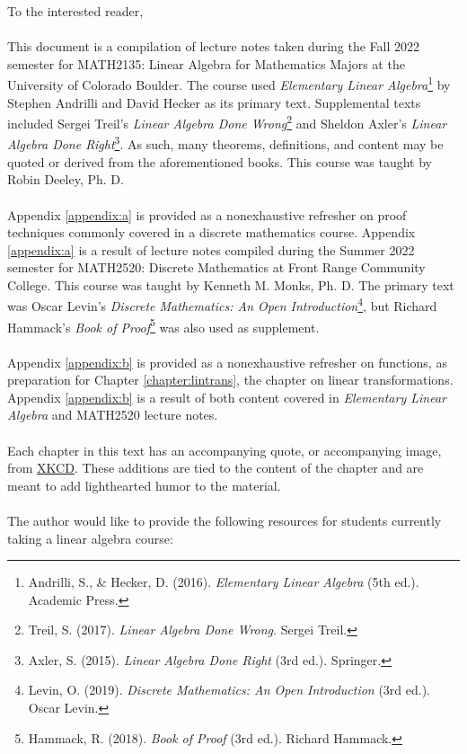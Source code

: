 To the interested reader,
\\
\\
This document is a compilation of lecture notes taken during the Fall 2022 semester for MATH2135: Linear Algebra for Mathematics Majors at the University of Colorado Boulder. The course used \textit{Elementary Linear Algebra}\footnote{Andrilli, S., \& Hecker, D. (2016). \textit{Elementary Linear Algebra} (5th ed.). Academic Press.} by Stephen Andrilli and David Hecker as its primary text. Supplemental texts included Sergei Treil's \textit{Linear Algebra Done Wrong}\footnote{Treil, S. (2017). \textit{Linear Algebra Done Wrong}. Sergei Treil.} and Sheldon Axler's \textit{Linear Algebra Done Right}\footnote{Axler, S. (2015). \textit{Linear Algebra Done Right} (3rd ed.). Springer. }. As such, many theorems, definitions, and content may be quoted or derived from the aforementioned books. This course was taught by Robin Deeley, Ph. D.
\\
\\
Appendix \ref{appendix:a} is provided as a nonexhaustive refresher on proof techniques commonly covered in a discrete mathematics course. Appendix \ref{appendix:a} is a result of lecture notes compiled during the Summer 2022 semester for MATH2520: Discrete Mathematics at Front Range Community College. This course was taught by Kenneth M. Monks, Ph. D. The primary text was Oscar Levin's \textit{Discrete Mathematics: An Open Introduction}\footnote{Levin, O. (2019). \textit{Discrete Mathematics: An Open Introduction} (3rd ed.). Oscar Levin.}, but Richard Hammack's \textit{Book of Proof}\footnote{Hammack, R. (2018). \textit{Book of Proof} (3rd ed.). Richard Hammack.} was also used as supplement.
\\
\\
Appendix \ref{appendix:b} is provided as a nonexhaustive refresher on functions, as preparation for Chapter \ref{chapter:lintrans}, the chapter on linear transformations. Appendix \ref{appendix:b} is a result of both content covered in \textit{Elementary Linear Algebra} and MATH2520 lecture notes.
\\
\\
Each chapter in this text has an accompanying quote, or accompanying image, from \href{https://xkcd.com/license.html}{XKCD}. These additions are tied to the content of the chapter and are meant to add lighthearted humor to the material. 
\\
\\
The author would like to provide the following resources for students currently taking a linear algebra course:
